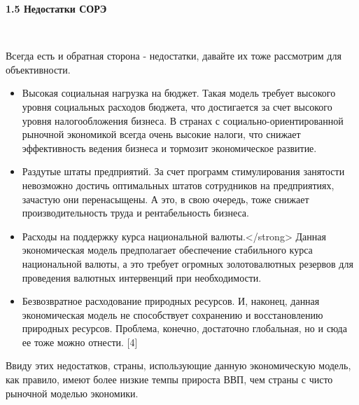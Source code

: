 \documentclass[14pt,a4paper]{article}
\begin{document}
    \begin{center}
        \textbf{1.5 Недостатки СОРЭ}
    \end{center}
    \\
    \par
    Всегда есть и обратная сторона - недостатки, давайте их тоже рассмотрим для объективности.
    \begin{itemize}
        \item Высокая социальная нагрузка на бюджет. Такая модель требует высокого
        уровня социальных расходов бюджета, что достигается за счет высокого уровня
        налогообложения бизнеса. В странах с социально-ориентированной рыночной экономикой
        всегда очень высокие налоги, что снижает эффективность ведения бизнеса и тормозит
        экономическое развитие.
        \item Раздутые штаты предприятий. За счет программ стимулирования занятости
        невозможно достичь оптимальных штатов сотрудников на предприятиях, зачастую они
        перенасыщены. А это, в свою очередь, тоже снижает производительность труда и
        рентабельность бизнеса.
        \item Расходы на поддержку курса национальной валюты.</strong> Данная экономическая
        модель предполагает обеспечение стабильного курса национальной валюты, а это требует
        огромных золотовалютных резервов для проведения валютных интервенций при необходимости.
        \item Безвозвратное расходование природных ресурсов. И, наконец, данная
        экономическая модель не способствует сохранению и восстановлению природных ресурсов.
        Проблема, конечно, достаточно глобальная, но и сюда ее тоже можно отнести. [4]
    \end{itemize}
    \par
    Ввиду этих недостатков, страны, использующие данную экономическую модель, как
    правило, имеют более низкие темпы прироста ВВП, чем страны с чисто рыночной моделью
    экономики.
\end{document}
